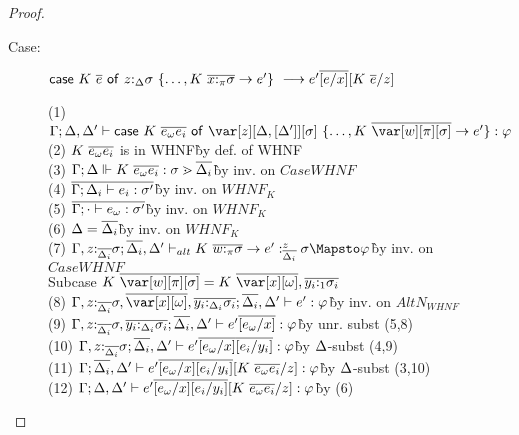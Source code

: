 \begin{proof}
\begin{description}
\item[Case:]
    $\mathsf{case}~K~\overline{e}~\mathsf{of}~z{:}_{\Delta}\sigma~\{\dots,K~\overline{x{:}_\pi\sigma}\to e'\}\ \longrightarrow e'\overline{[e/x]}[K~\overline{e}/z]$
\begin{tabbing}
    (1) $\G;\D,\D'\vdash \ccase{K~\ov{e_\omega e_i}}{\zD~\{\dots,K~\ov{\var[w][\pi][\s]}\to e'\}} : \vp$\\
    (2) $K~\overline{e_\omega e_i}$ is in WHNF\` by def. of WHNF\\
    (3) $\Gamma;\Delta \Vdash K~\overline{e_\omega e_i} : \sigma \gtrdot \overline{\Delta_i} $\` by inv. on $CaseWHNF$\\
    (4) $\overline{\Gamma; \Delta_i \vdash e_i : \sigma'}$\`by inv. on $WHNF_K$\\
    (5) $\overline{\Gamma; \cdot \vdash e_\omega : \sigma'}$\`by inv. on $WHNF_K$\\
    (6) $\Delta = \overline{\Delta_i}$\` by inv. on $WHNF_K$\\
    (7) $\G, z{:}_{\ov{\D_i}}\s; \ov{\D_i}, \D' \vdash_{alt} K~\ov{w{:}_\pi\s} \to e' :_{\ov{\D_i}}^z \s \Mapsto \vp$\` by inv. on $CaseWHNF$\\
    Subcase $K~\ov{\var[w][\pi][\s]} = K~\ov{\xo},\ov{y_i{:}_1\s_i}$\\
    (8) $\G,z{:}_{\ov{\D_i}}\s,\ov{\xo},\ov{y_i{:}_{\D_i}\s_i}; \ov{\D_i}, \D' \vdash e' : \vp$\`by inv. on $AltN_{WHNF}$\\
    (9) $\Gamma,z{:}_{\overline{\Delta_i}}\sigma,\overline{y_i{:}_{\Delta_i}\sigma_i}; \overline{\Delta_i}, \Delta' \vdash e'\overline{[e_\omega/x]} : \varphi$\`by unr. subst (5,8)\\
    (10) $\Gamma,z{:}_{\overline{\Delta_i}}\sigma; \overline{\Delta_i}, \Delta' \vdash e'\overline{[e_\omega/x]}\overline{[e_i/y_i]} : \varphi$\`by $\Delta$-subst (4,9)\\
    (11) $\Gamma; \overline{\Delta_i}, \Delta' \vdash e'\overline{[e_\omega/x]}\overline{[e_i/y_i]}[K~\overline{e_\omega e_i}/z] : \varphi$\`by $\Delta$-subst (3,10)\\
    (12) $\Gamma; \Delta, \Delta'\vdash e'\overline{[e_\omega/x]}\overline{[e_i/y_i]}[K~\overline{e_\omega e_i}/z] : \varphi$\`by (6)\\

\end{tabbing}
\end{description}
\end{proof}
